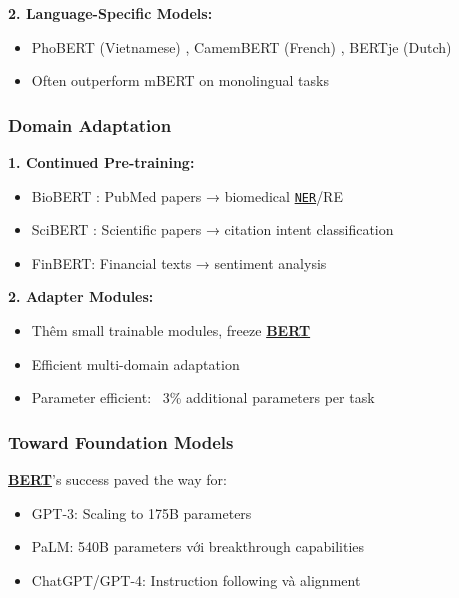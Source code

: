 \textbf{2.
Language-Specific Models:}
\begin{itemize}
    \item PhoBERT (Vietnamese) \cite{nguyen2020phobert}, CamemBERT (French) \cite{martin2019camembert}, BERTje (Dutch)
    \item Often outperform mBERT on monolingual tasks
\end{itemize}

\subsubsection{Domain Adaptation}

\textbf{1.
Continued Pre-training:}
\begin{itemize}
    \item BioBERT \cite{lee2020biobert}: PubMed papers → biomedical \hyperref[acro:ner]{\texttt{NER}}/RE
    \item SciBERT \cite{beltagy2019scibert}: Scientific papers → citation intent classification
    \item FinBERT: Financial texts → sentiment analysis
\end{itemize}

\textbf{2.
Adapter Modules:}
\begin{itemize}
    \item Thêm small trainable modules, freeze \hyperref[acro:bert]{\textbf{BERT}}
    \item Efficient multi-domain adaptation
    \item Parameter efficient: ~3\% additional parameters per task
\end{itemize}

\subsubsection{Toward Foundation Models}
\hyperref[acro:bert]{\textbf{BERT}}'s success paved the way for:
\begin{itemize}
    \item GPT-3: Scaling to 175B parameters
    \item PaLM: 540B parameters với breakthrough capabilities
    \item ChatGPT/GPT-4: Instruction following và alignment
\end{itemize}

